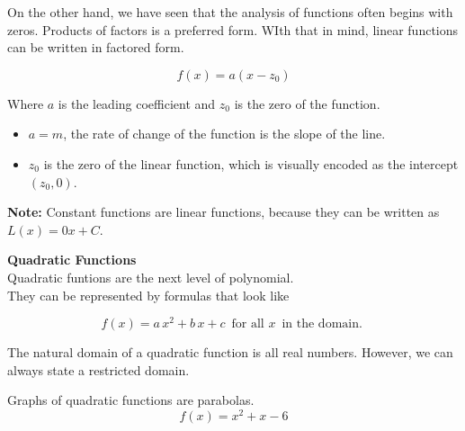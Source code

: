 \documentclass{ximera}
\begin{document}
On the other hand, we have seen that the analysis of functions often begins with zeros.  Products of factors is a preferred form.  WIth that in mind, linear functions can be written in factored form.


\[  f(x) = a (x - z_0)  \]

Where $a$ is the leading coefficient and $z_0$ is the zero of the function.





\begin{itemize}

\item $a = m$, the rate of change of the function is the slope of the line.

\item $z_0$ is the zero of the linear function, which is visually encoded as the intercept $(z_0, 0)$.

\end{itemize}



\textbf{Note:} Constant functions are linear functions, because they can be written as $L(x) = 0 x + C$. \\












\begin{template}  \textbf{\textcolor{blue!55!black}{Quadratic Functions}} \\



Quadratic funtions are the next level of polynomial. \\


They can be represented by formulas that look like


\[ f(x) = a \, x^2 + b \, x + c  \,  \text{ for all } x  \, \text{ in the domain. }   \]



\end{template}



The natural domain of a quadratic function is all real numbers.  However, we can always state a restricted domain.







Graphs of quadratic functions are parabolas. 
\[ f(x) = x^2 + x - 6\]
\end{document}
